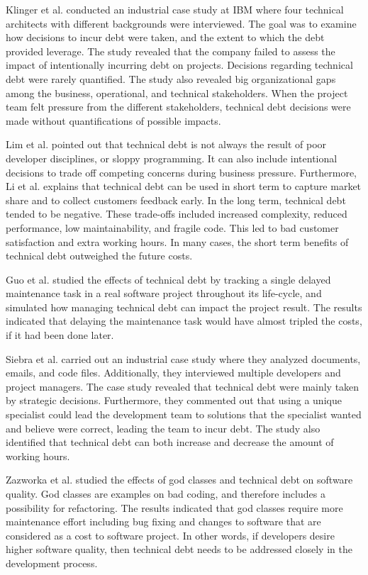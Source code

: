 Klinger et al.\cite{p35-klinger} conducted an industrial case study at IBM where four technical architects with different backgrounds were interviewed. The goal was to examine how decisions to incur debt were taken, and the extent to which the debt provided leverage\cite{p35-klinger}. The study revealed that the company failed to assess the impact of intentionally incurring debt on projects. Decisions regarding technical debt were rarely quantified. The study also revealed big organizational gaps among the business, operational, and technical stakeholders. When the project team felt pressure from the different stakeholders, technical debt decisions were made without quantifications of possible impacts.

Lim et al.\cite{lim-taksande} pointed out that technical debt is not always the result of poor developer disciplines, or sloppy programming. It can also include intentional decisions to trade off competing concerns during business pressure. Furthermore, Li et al. explains that technical debt can be used in short term to capture market share and to collect customers feedback early. In the long term, technical debt tended to be negative. These trade-offs included increased complexity, reduced performance, low maintainability, and fragile code. This led to bad customer satisfaction and extra working hours. In many cases, the short term benefits of technical debt outweighed the future costs.

Guo et al.\cite{guo2011tracking} studied the effects of technical debt by tracking a single delayed maintenance task in a real software project throughout its life-cycle, and simulated how managing technical debt can impact the project result. The results indicated that delaying the maintenance task would have almost tripled the costs, if it had been done later.

Siebra et al.\cite{p247-siebra} carried out an industrial case study where they analyzed documents, emails, and code files. Additionally, they interviewed multiple developers and project managers. The case study revealed that technical debt were mainly taken by strategic decisions. Furthermore, they commented out that using a unique specialist could lead the development team to solutions that the specialist wanted and believe were correct, leading the team to incur debt. The study also identified that technical debt can both increase and decrease the amount of working hours.

Zazworka et al.\cite{zazworka2011investigating} studied the effects of god classes and technical debt on software quality. God classes are examples on bad coding, and therefore includes a possibility for refactoring\cite{Zazworka:2011:PDD:1985362.1985372}. The results indicated that god classes require more maintenance effort including bug fixing and changes to software that are considered as a cost to software project. In other words, if developers desire higher software quality, then technical debt needs to be addressed closely in the development process.

